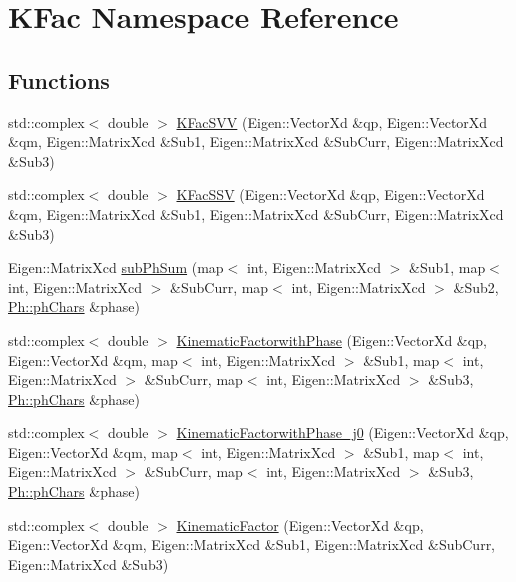 \hypertarget{namespaceKFac}{}\section{K\+Fac Namespace Reference}
\label{namespaceKFac}
\subsection*{Functions}
\begin{DoxyCompactItemize}
\item 
std\+::complex$<$ double $>$ \mbox{\hyperlink{namespaceKFac_a9c2aaf9fd1ca6172ffc09b8cf0c30d0e}{K\+Fac\+S\+VV}} (Eigen\+::\+Vector\+Xd \&qp, Eigen\+::\+Vector\+Xd \&qm, Eigen\+::\+Matrix\+Xcd \&Sub1, Eigen\+::\+Matrix\+Xcd \&Sub\+Curr, Eigen\+::\+Matrix\+Xcd \&Sub3)
\item 
std\+::complex$<$ double $>$ \mbox{\hyperlink{namespaceKFac_a3fc08fc4d40cb022d9e68ea0e9e39044}{K\+Fac\+S\+SV}} (Eigen\+::\+Vector\+Xd \&qp, Eigen\+::\+Vector\+Xd \&qm, Eigen\+::\+Matrix\+Xcd \&Sub1, Eigen\+::\+Matrix\+Xcd \&Sub\+Curr, Eigen\+::\+Matrix\+Xcd \&Sub3)
\item 
Eigen\+::\+Matrix\+Xcd \mbox{\hyperlink{namespaceKFac_ac23a25c1e9762e3c46e69835193075df}{sub\+Ph\+Sum}} (map$<$ int, Eigen\+::\+Matrix\+Xcd $>$ \&Sub1, map$<$ int, Eigen\+::\+Matrix\+Xcd $>$ \&Sub\+Curr, map$<$ int, Eigen\+::\+Matrix\+Xcd $>$ \&Sub2, \mbox{\hyperlink{structPh_1_1phChars}{Ph\+::ph\+Chars}} \&phase)
\item 
std\+::complex$<$ double $>$ \mbox{\hyperlink{namespaceKFac_ac10b1bd8db1661c292e327a3eabcebb9}{Kinematic\+Factorwith\+Phase}} (Eigen\+::\+Vector\+Xd \&qp, Eigen\+::\+Vector\+Xd \&qm, map$<$ int, Eigen\+::\+Matrix\+Xcd $>$ \&Sub1, map$<$ int, Eigen\+::\+Matrix\+Xcd $>$ \&Sub\+Curr, map$<$ int, Eigen\+::\+Matrix\+Xcd $>$ \&Sub3, \mbox{\hyperlink{structPh_1_1phChars}{Ph\+::ph\+Chars}} \&phase)
\item 
std\+::complex$<$ double $>$ \mbox{\hyperlink{namespaceKFac_a87a5304db9d4c659637da23e363cf4a4}{Kinematic\+Factorwith\+Phase\+\_\+j0}} (Eigen\+::\+Vector\+Xd \&qp, Eigen\+::\+Vector\+Xd \&qm, map$<$ int, Eigen\+::\+Matrix\+Xcd $>$ \&Sub1, map$<$ int, Eigen\+::\+Matrix\+Xcd $>$ \&Sub\+Curr, map$<$ int, Eigen\+::\+Matrix\+Xcd $>$ \&Sub3, \mbox{\hyperlink{structPh_1_1phChars}{Ph\+::ph\+Chars}} \&phase)
\item 
std\+::complex$<$ double $>$ \mbox{\hyperlink{namespaceKFac_a56130e258872427e83c530a5a471cf5c}{Kinematic\+Factor}} (Eigen\+::\+Vector\+Xd \&qp, Eigen\+::\+Vector\+Xd \&qm, Eigen\+::\+Matrix\+Xcd \&Sub1, Eigen\+::\+Matrix\+Xcd \&Sub\+Curr, Eigen\+::\+Matrix\+Xcd \&Sub3)

\end{DoxyCompactItemize}
